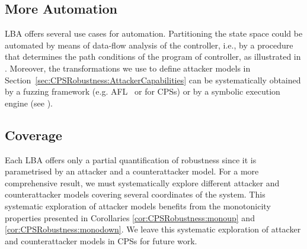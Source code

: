 {\subsection{More Automation}
LBA offers several use cases for automation. Partitioning the state space could be automated by means of data-flow analysis of the controller, i.e., by a procedure that determines the path conditions of the program of controller, as illustrated in \cite{castellanos2021AttkFinder}. Moreover, the transformations we use to define attacker models in Section~\ref{sec:CPSRobustness:AttackerCapabilities} can be systematically obtained by a fuzzing framework (e.g. AFL~\cite{AFL} or \cite{chen2019learning} for CPSs) or by a symbolic execution engine (see \cite{castellanos2021AttkFinder}).


\subsection{Coverage}
Each LBA offers only a partial quantification of robustness since it is parametrised by an attacker and a counterattacker model. For a more comprehensive result, we must systematically explore different attacker and counterattacker models covering several coordinates of the system. This systematic exploration of attacker models benefits from the monotonicity properties presented in Corollaries \ref{cor:CPSRobustness:monoup} and \ref{cor:CPSRobustness:monodown}. We leave this systematic exploration of attacker and counterattacker models in CPSs for future work.


}
